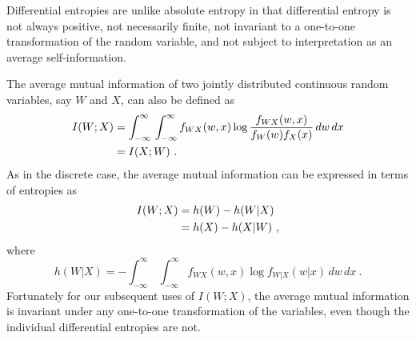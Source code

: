 Differential entropies are unlike absolute entropy in that differential
entropy is not always
positive, not necessarily finite, not invariant to a one-to-one transformation
of the random variable, and not subject to interpretation as an average
self-information.

The average mutual information of two jointly distributed continuous random
variables, say $W$ and $X$, can also be defined as
\begin{align}
 I (W;X) &= \int^\infty_{-\infty} \,\int^\infty_{-\infty} f_{WX} (w,x)
 \log \frac{ f_{WX} (w,x) }  {f_W (w) f_X (x)} \, dw \,dx
\notag\\
 &= I (X;W)~.
\label{ch01.eq11.2.28}
\end{align}
As in the discrete case, the average mutual information can be expressed in
terms of entropies as
\begin{align}
 I (W;X) & = h (W) -  h(W|X)
\notag\\
  &= h (X) - h (X|W)~,
\label{ch01.eq11.2.29}
\end{align}
where
\begin{equation}
 h (W|X) = - \int^\infty_{-\infty} \,\int^\infty_{-\infty} f_{WX} (w,x)
 \log f_{W|X} (w|x) \, dw \,dx ~.
\label{ch01.eq11.2.30}
\end{equation}
Fortunately for our subsequent uses  of $I(W;X)$, the average
mutual information
is invariant under any one-to-one transformation of the variables,
even though
the individual differential entropies are not.

